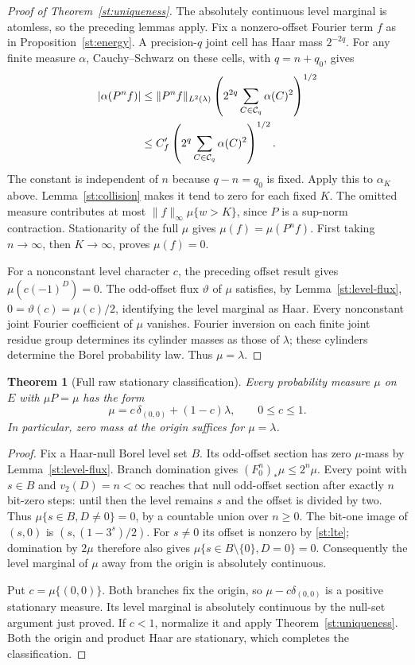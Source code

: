 \documentclass[11pt]{amsart}
\newtheorem{theorem}{Theorem}[section]
\theoremstyle{definition}
\theoremstyle{remark}
\begin{document}
\begin{proof}[Proof of Theorem~\ref{st:uniqueness}]
The absolutely continuous level marginal is atomless, so the preceding
lemmas apply.  Fix a nonzero-offset Fourier term $f$ as in
Proposition~\ref{st:energy}.  A precision-$q$ joint cell has Haar mass
$2^{-2q}$.  For any finite measure $\alpha$, Cauchy--Schwarz on these
cells, with $q=n+q_0$, gives
\begin{align}
 |\alpha(P^nf)|
 &\le\|P^nf\|_{L^2(\lambda)}
       \left(2^{2q}\sum_{C\in\mathcal C_q}\alpha(C)^2\right)^{1/2}
 \notag\\
 &\le C'_f\left(2^q\sum_{C\in\mathcal C_q}\alpha(C)^2\right)^{1/2}.
 \label{st:energy-collision}
\end{align}
The constant is independent of $n$ because $q-n=q_0$ is fixed.
Apply this to $\alpha_K$ above.  Lemma~\ref{st:collision} makes it tend
to zero for each fixed $K$.  The omitted measure contributes at most
$\|f\|_\infty\mu\{w>K\}$, since $P$ is a sup-norm contraction.
Stationarity of the full $\mu$ gives $\mu(f)=\mu(P^nf)$.  First taking
$n\to\infty$, then $K\to\infty$, proves $\mu(f)=0$.

For a nonconstant level character $c$, the preceding offset result gives
$\mu(c(-1)^D)=0$.  The odd-offset flux $\vartheta$ of $\mu$ satisfies,
by Lemma~\ref{st:level-flux},
$0=\vartheta(c)=\mu(c)/2$, identifying the level marginal as Haar.
Every nonconstant joint
Fourier coefficient of $\mu$ vanishes.  Fourier inversion on each finite
joint residue group determines its cylinder masses as those of
$\lambda$; these cylinders determine the Borel probability law.  Thus
$\mu=\lambda$.
\end{proof}

\begin{theorem}[Full raw stationary classification]\label{st:classification}
Every probability measure $\mu$ on $E$ with $\mu P=\mu$ has the form
\[
 \mu=c\,\delta_{(0,0)}+(1-c)\lambda,\qquad 0\le c\le1.
\]
In particular, zero mass at the origin suffices for $\mu=\lambda$.
\end{theorem}
\begin{proof}
Fix a Haar-null Borel level set $B$.  Its odd-offset section has zero
$\mu$-mass by Lemma~\ref{st:level-flux}.  Branch domination gives
$(F_0^n)_*\mu\le2^n\mu$.  Every point with $s\in B$ and
$v_2(D)=n<\infty$ reaches that null odd-offset section after exactly
$n$ bit-zero steps: until then the level remains $s$ and the offset is
divided by two.  Thus $\mu\{s\in B,D\ne0\}=0$, by a countable union
over $n\ge0$.  The bit-one image of $(s,0)$ is
$(s,(1-3^s)/2)$.  For $s\ne0$ its offset is nonzero by
\eqref{st:lte}; domination by $2\mu$ therefore also gives
$\mu\{s\in B\setminus\{0\},D=0\}=0$.
Consequently the level marginal of $\mu$ away from the origin is
absolutely continuous.

Put $c=\mu\{(0,0)\}$.  Both branches fix the origin, so
$\mu-c\delta_{(0,0)}$ is a positive stationary measure.  Its level
marginal is absolutely continuous by the null-set argument just proved.
If $c<1$, normalize it and apply Theorem~\ref{st:uniqueness}.
Both the origin and product Haar are stationary, which completes the
classification.
\end{proof}
\end{document}
